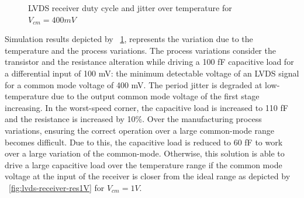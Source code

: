 \begin{figure}[htp]
\begin{subfigure}[b]{0.32\textwidth}
    \end{subfigure}
    \caption{LVDS receiver duty cycle and jitter over temperature for $V_{cm} = 400 mV$}
    \label{fig:lvds-receiver-res}
\end{figure}

Simulation results depicted by \figurename~\ref{fig:lvds-receiver-res}, represents the variation due to the temperature and the process variations. The process variations consider the transistor and the resistance alteration while driving a 100 fF capacitive load for a differential input of 100 mV: the minimum detectable voltage of an LVDS signal for a common mode voltage of 400 mV. The period jitter is degraded at low-temperature due to the output common mode voltage of the first stage increasing. In the worst-speed corner, the capacitive load is increased to 110 fF and the resistance is increased by 10\%. Over the manufacturing process variations, ensuring the correct operation over a large common-mode range becomes difficult. Due to this, the capacitive load is reduced to 60 fF to work over a large variation of the common-mode. Otherwise, this solution is able to drive a large capacitive load over the temperature range if the common mode voltage at the input of the receiver is closer from the ideal range as depicted by \figurename~\ref{fig:lvds-receiver-res1V} for $V_{cm} = 1 V$.

